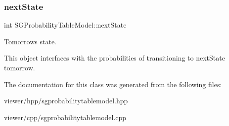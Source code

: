 \subsubsection{\texorpdfstring{next\+State}{nextState}}
{\footnotesize\ttfamily int S\+G\+Probability\+Table\+Model\+::next\+State\hspace{0.3cm}{\ttfamily [private]}}



Tomorrow\textquotesingle{}s state. 

This object interfaces with the probabilities of transitioning to next\+State tomorrow. 

The documentation for this class was generated from the following files\+:\begin{DoxyCompactItemize}
\item 
viewer/hpp/sgprobabilitytablemodel.\+hpp\item 
viewer/cpp/sgprobabilitytablemodel.\+cpp\end{DoxyCompactItemize}
